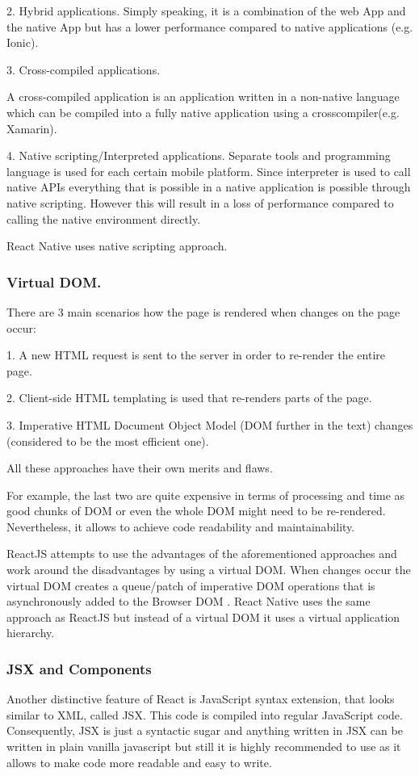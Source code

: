 2. Hybrid applications.
Simply speaking, it is a combination of the web App and the native App but has a lower performance compared to
native applications (e.g. Ionic). 

3. Cross-compiled applications.

A cross-compiled application is an application written in a non-native language which can be compiled into a fully native application using a crosscompiler(e.g. Xamarin). 

4. Native scripting/Interpreted  applications.
Separate tools and programming language is used for each certain mobile platform.
Since interpreter is used to call native APIs everything that is possible in a native application is possible through native scripting. However this will result in a loss of performance compared to calling the native environment directly.

React Native uses native scripting approach.

\subsubsection{Virtual DOM.}
There are 3 main scenarios how the page is rendered when changes on the page occur:

1. A new HTML request is sent to the server in order to re-render the entire page. 

2. Client-side HTML templating is used that re-renders parts of the page. 

3. Imperative HTML Document Object Model (DOM further in the text) changes (considered to be the most efficient one).

All these approaches have their own merits and flaws. 

For example, the last two are quite expensive in terms of processing and time as good chunks of DOM or even the whole DOM might need to be re-rendered.
Nevertheless, it allows to achieve code readability and maintainability. 

ReactJS attempts to use the advantages of the aforementioned approaches and work around the disadvantages by using a virtual DOM. When changes occur the virtual DOM creates a queue/patch
of imperative DOM operations that is asynchronously added to the Browser DOM \cite{danielsson2016react}.
React Native  uses the same
approach as ReactJS but instead of a
virtual DOM it uses a virtual application hierarchy.

\subsubsection{JSX and Components}
Another distinctive feature of React is JavaScript syntax extension, that looks similar to XML, called JSX. This code is compiled into regular JavaScript
code. Consequently, JSX is just a syntactic sugar and anything written in JSX can be written in plain vanilla javascript but still it is highly recommended to use as it allows to make code more readable and easy to write. 

